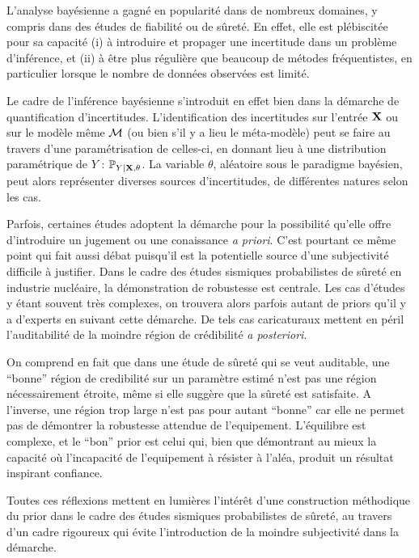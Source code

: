 L'analyse bayésienne a gagné en popularité dans de nombreux domaines, y compris dans des études de fiabilité ou de sûreté. 
En effet, elle est plébiscitée pour sa capacité (i) à introduire et propager une incertitude dans un problème d'inférence, et (ii) à être plus régulière que beaucoup de métodes fréquentistes, en particulier lorsque le nombre de données observées est limité.

Le cadre de l'inférence bayésienne s'introduit en effet bien dans la démarche de quantification d'incertitudes. 
L'identification des incertitudes sur l'entrée $\mathbf{X}$ ou sur le modèle même $\mathcal{M}$ (ou bien s'il y a lieu le méta-modèle) peut se faire au travers d'une paramétrisation de celles-ci, en donnant lieu à une distribution paramétrique de $Y$ : $\mathbb{P}_{Y|\mathbf{X},\theta}$. La variable $\theta$, aléatoire sous le paradigme bayésien, peut alors représenter diverses sources d'incertitudes, de différentes natures selon les cas.


Parfois, certaines études adoptent la démarche pour la possibilité qu'elle offre d'introduire un jugement  ou une conaissance \emph{a priori}.
C'est pourtant ce même point qui fait aussi débat puisqu'il est la potentielle source d'une subjectivité difficile à justifier.
Dans le cadre des études sismiques probabilistes de sûreté en industrie nucléaire, la démonstration de robustesse est centrale. Les cas d'études y étant souvent très complexes, on trouvera alors parfois autant de priors qu'il y a d'experts en suivant cette démarche.
De tels cas caricaturaux mettent en péril l'auditabilité de la moindre région de crédibilité \emph{a posteriori}.


On comprend en fait que dans une étude de sûreté qui se veut auditable, une ``bonne'' région de credibilité sur un paramètre estimé n'est pas une région nécessairement étroite, même si elle suggère que la sûreté est satisfaite. A l'inverse, une région trop large n'est pas pour autant ``bonne'' car elle ne permet pas de démontrer la robustesse attendue de l'equipement. L'équilibre est complexe, et le ``bon'' prior est celui qui, bien que démontrant au mieux la capacité où l'incapacité de l'equipement à résister à l'aléa, produit un résultat inspirant confiance. %

Toutes ces réflexions mettent en lumières l'intérêt d'une construction méthodique du prior dans le cadre des études sismiques probabilistes de sûreté, au travers d'un cadre rigoureux qui évite l'introduction de la moindre subjectivité dans la démarche.










